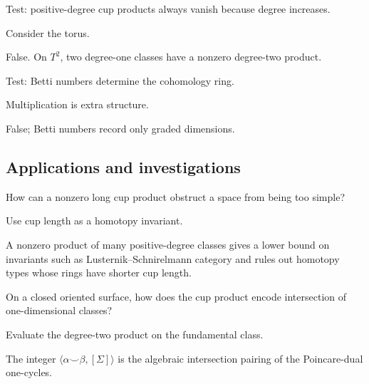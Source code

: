 \begin{exercise}\label{exr:viii29-ped-11}
Test: positive-degree cup products always vanish because degree increases.
\end{exercise}
\begin{hint}
Consider the torus.
\end{hint}
\begin{solution}
False. On $T^2$, two degree-one classes have a nonzero degree-two product.
\end{solution}

\begin{exercise}\label{exr:viii29-ped-12}
Test: Betti numbers determine the cohomology ring.
\end{exercise}
\begin{hint}
Multiplication is extra structure.
\end{hint}
\begin{solution}
False; Betti numbers record only graded dimensions.
\end{solution}

\subsection*{Applications and investigations}

\begin{exercise}\label{exr:viii29-ped-13}
How can a nonzero long cup product obstruct a space from being too simple?
\end{exercise}
\begin{hint}
Use cup length as a homotopy invariant.
\end{hint}
\begin{solution}
A nonzero product of many positive-degree classes gives a lower bound on invariants such as Lusternik--Schnirelmann category and rules out homotopy types whose rings have shorter cup length.
\end{solution}

\begin{exercise}\label{exr:viii29-ped-14}
On a closed oriented surface, how does the cup product encode intersection of one-dimensional classes?
\end{exercise}
\begin{hint}
Evaluate the degree-two product on the fundamental class.
\end{hint}
\begin{solution}
The integer $\langle \alpha\smile\beta,[\Sigma]\rangle$ is the algebraic intersection pairing of the Poincare-dual one-cycles.
\end{solution}

